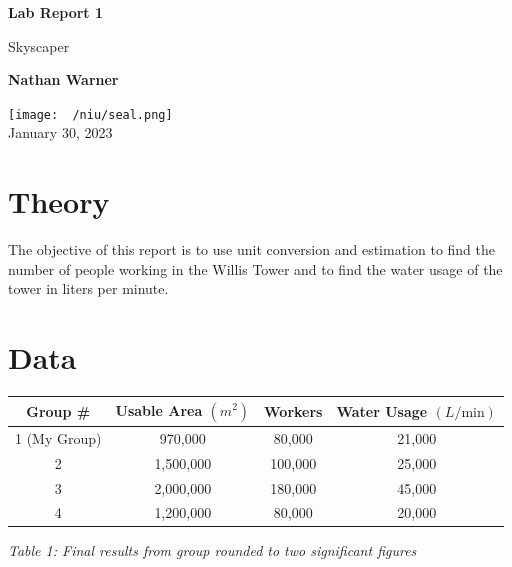 \documentclass{report}
\title{\Huge{}}
\author{\huge{Nathan Warner}}
\date{\huge{}}
\begin{document}
        \begin{titlepage}
       \begin{center}
           \vspace*{1cm}
    
           \textbf{Lab Report 1}
    
           \vspace{0.5cm}
            Skyscaper
                
           \vspace{1.5cm}
    
           \textbf{Nathan Warner}
    
           \vfill
                
                
           \vspace{0.8cm}
         
           \texttt{[image: ~/niu/seal.png]} \\
           January 30, 2023
           
                
       \end{center}
    \end{titlepage}
    \tableofcontents
    \pagebreak 
    \section{Theory}
    \bigbreak \noindent 
    The objective of this report is to use unit conversion and estimation to find the number of people working in the Willis Tower and to find the water usage of the tower in liters per minute.

    \bigbreak \noindent 
    \section{Data}
    \bigbreak \noindent 
    \begin{center}
        \begin{tabular}{cccc}
            Group \# & Usable Area $(m^{2})$ & Workers & Water Usage $(L/\text{min}) $ \\
            \hline
            1 (My Group)  & 970,000 & 80,000 & 21,000 \\
            2 & 1,500,000 & 100,000 & 25,000 \\
            3 & 2,000,000 & 180,000 & 45,000 \\
            4 & 1,200,000 & 80,000 & 20,000 \\
        \end{tabular}
        \smallbreak \noindent
        \textit{Table 1: Final results from group rounded to two significant figures}
    \end{center}
\end{document}
